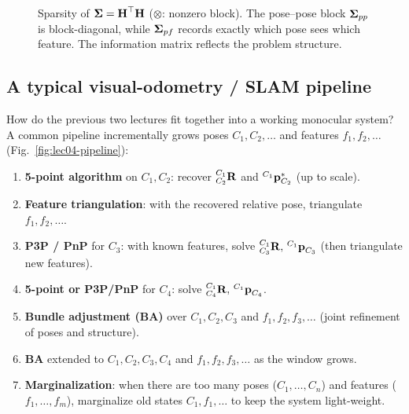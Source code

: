 \begin{figure}[H]
\centering
{}
\caption{Sparsity of $\boldsymbol{\mathbf{\Sigma}}=\boldsymbol{\mathbf{H}}^\top\boldsymbol{\mathbf{H}}$ ($\otimes$: nonzero block). The pose--pose block $\boldsymbol{\mathbf{\Sigma}}_{pp}$ is block-diagonal, while $\boldsymbol{\mathbf{\Sigma}}_{pf}$ records exactly which pose sees which feature. The information matrix reflects the problem structure.}
\label{fig:lec04-infomat}
\end{figure}

\subsection{A typical visual-odometry / SLAM pipeline}

How do the previous two lectures fit together into a working monocular system? A common pipeline incrementally grows poses $C_1,C_2,\dots$ and features $f_1,f_2,\dots$ (Fig.~\ref{fig:lec04-pipeline}):
\begin{enumerate}[label=(\arabic*),noitemsep,topsep=2pt]
\item \textbf{5-point algorithm} on $C_1,C_2$: recover ${}^{C_1}_{C_2}\boldsymbol{\mathbf{R}}$ and ${}^{C_1}\boldsymbol{\mathbf{p}}_{C_2}^{*}$ (up to scale).
\item \textbf{Feature triangulation}: with the recovered relative pose, triangulate $f_1,f_2,\dots$.
\item \textbf{P3P / PnP} for $C_3$: with known features, solve ${}^{C_1}_{C_3}\boldsymbol{\mathbf{R}},\,{}^{C_1}\boldsymbol{\mathbf{p}}_{C_3}$ (then triangulate new features).
\item \textbf{5-point or P3P/PnP} for $C_4$: solve ${}^{C_1}_{C_4}\boldsymbol{\mathbf{R}},\,{}^{C_1}\boldsymbol{\mathbf{p}}_{C_4}$.
\item \textbf{Bundle adjustment (BA)} over $C_1,C_2,C_3$ and $f_1,f_2,f_3,\dots$ (joint refinement of poses and structure).
\item \textbf{BA} extended to $C_1,C_2,C_3,C_4$ and $f_1,f_2,f_3,\dots$ as the window grows.
\item \textbf{Marginalization}: when there are too many poses ($C_1,\dots,C_n$) and features ($f_1,\dots,f_m$), marginalize old states $C_1,f_1,\dots$ to keep the system light-weight.
\end{enumerate}

